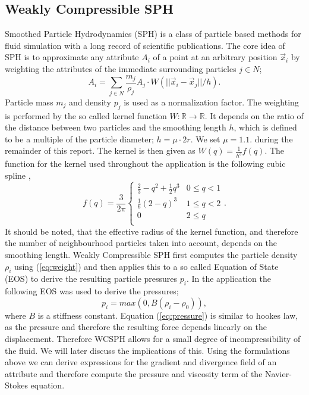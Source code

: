 \documentclass[11pt, letterpaper, twocolumn]{article}
\begin{document}
\subsection{Weakly Compressible SPH}
\label{subsec:wcsph}
Smoothed Particle Hydrodynamics (SPH) is a class of particle based methods for fluid simulation with a long record of scientific publications.
The core idea of SPH is to approximate any attribute \( A_i\) of a point at an arbitrary position \(\vec{x}_i\) by weighting the attributes of the immediate surrounding particles \(j \in N \);
\begin{equation}
  A_i = \sum_{j \in N} \frac{m_j}{\rho_j}  A_j \cdot  W(||\vec{x}_i - \vec{x}_j||/h).
  \label{eq:weight}
\end{equation}
Particle mass \(m_j\) and density \(p_j\) is used as a normalization factor.
The weighting is performed by the so called kernel function \( W : \mathbb{R} \rightarrow \mathbb{R}\). It depends on the ratio of the distance between two particles and the smoothing length \(h\), which is defined to be a multiple of the particle diameter; \(h = \mu \cdot 2r\). We set \(\mu = 1.1.\) during the remainder of this report. The kernel is then given as \( W(q) = \frac{1}{h^3}f(q)\).
The function for the kernel used throughout the application is the following cubic spline \cite{monaghan1992},
\begin{equation}
  f(q) = \frac{3}{2\pi}
  \begin{cases}
    \frac{2}{3} - q^2 + \frac{1}{2}q^3 & 0 \leq q < 1 \\
    \frac{1}{6}(2-q)^3 & 1 \leq q < 2 \\
    0 & 2 \leq q \\
  \end{cases}
  .
\end{equation}
It should be noted, that the effective radius of the kernel function, and therefore the number of neighbourhood particles taken into account, depends on the smoothing length.
Weakly Compressible SPH first computes the particle density \(\rho_i\) using (\ref{eq:weight}) and then applies this to a so called Equation of State (EOS) to derive the resulting particle pressures \(p_i\). In the application the following EOS was used to derive the pressures;
\begin{equation}
  p_i = max(0, B(\rho_i - \rho_0)),
  \label{eq:pressure}
\end{equation}
where \(B\) is a stiffness constant. Equation (\ref{eq:pressure}) is similar to hookes law, as the pressure and therefore the resulting force depends linearly on the displacement. Therefore WCSPH allows for a small degree of incompressibility of the fluid. We will later discuss the implications of this. 
Using the formulations above we can derive expressions for the gradient and divergence field of an attribute and therefore compute the pressure and viscosity term of the Navier-Stokes equation.
\end{document}
